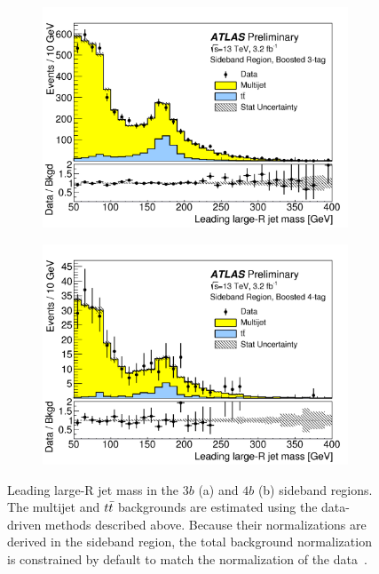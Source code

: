 \begin{figure}[h!]
  \centering
  \captionsetup{justification=centering}

   \begin{subfigure}[t]{0.5\textwidth}
        \centering
        \includegraphics[width=\textwidth]{figures/3b_sideband}
        \caption{}
    \end{subfigure}%
    \begin{subfigure}[t]{0.5\textwidth}
        \centering
        \includegraphics[width=\textwidth]{figures/4b_sideband}
        \caption{}
    \end{subfigure}

   \caption{Leading large-R jet mass in the $3b$ (a) and $4b$ (b) sideband regions. The multijet and $t\bar{t}$ backgrounds are estimated using the data-driven methods described above. Because their normalizations are derived in the sideband region, the total background normalization is constrained by default to match the normalization of the data~\cite{4bconf}.}
  \label{fig:4b_sideband}
\end{figure}

